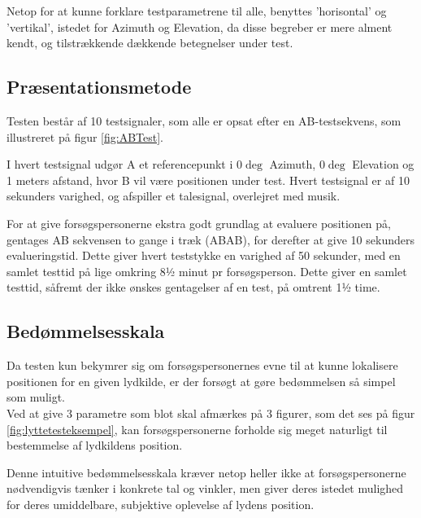 Netop for at kunne forklare testparametrene til alle, benyttes 'horisontal' og 'vertikal', istedet for Azimuth og Elevation, da disse begreber er mere alment kendt, og tilstrækkende dækkende betegnelser under test. 

\subsection{Præsentationsmetode}

Testen består af 10 testsignaler, som alle er opsat efter en AB-testsekvens, som illustreret på figur \ref{fig:ABTest}. 


I hvert testsignal udgør A et referencepunkt i $0\deg$ Azimuth, $0\deg$ Elevation og 1 meters afstand, hvor B vil være positionen under test. 
Hvert testsignal er af 10 sekunders varighed, og afspiller et talesignal, overlejret med musik. 

For at give forsøgspersonerne ekstra godt grundlag at evaluere positionen på, gentages AB sekvensen to gange i træk (ABAB), for derefter at give 10 sekunders evalueringstid.
Dette giver hvert teststykke en varighed af 50 sekunder, med en samlet testtid på lige omkring 8½ minut pr forsøgsperson. 
Dette giver en samlet testtid, såfremt der ikke ønskes gentagelser af en test, på omtrent 1½ time.


\subsection{Bedømmelsesskala}

Da testen kun bekymrer sig om forsøgspersonernes evne til at kunne lokalisere positionen for en given lydkilde, er der forsøgt at gøre bedømmelsen så simpel som muligt. \\
Ved at give 3 parametre som blot skal afmærkes på 3 figurer, som det ses på figur \ref{fig:lyttetesteksempel}, kan forsøgspersonerne forholde sig meget naturligt til bestemmelse af lydkildens position.


Denne intuitive bedømmelsesskala kræver netop heller ikke at forsøgspersonerne nødvendigvis tænker i konkrete tal og vinkler, men giver deres istedet mulighed for deres umiddelbare, subjektive oplevelse af lydens position. 

